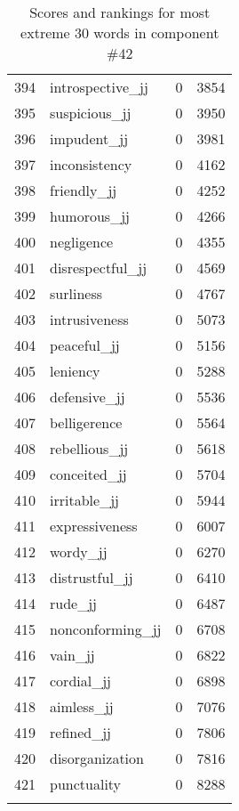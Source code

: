 \begin{longtable}[!htbp]{| rlr@{.}l |}
    394 & introspective\_jj & 0 & 3854 \\
    395 & suspicious\_jj & 0 & 3950 \\
    396 & impudent\_jj & 0 & 3981 \\
    397 & inconsistency & 0 & 4162 \\
    398 & friendly\_jj & 0 & 4252 \\
    399 & humorous\_jj & 0 & 4266 \\
    400 & negligence & 0 & 4355 \\
    401 & disrespectful\_jj & 0 & 4569 \\
    402 & surliness & 0 & 4767 \\
    403 & intrusiveness & 0 & 5073 \\
    404 & peaceful\_jj & 0 & 5156 \\
    405 & leniency & 0 & 5288 \\
    406 & defensive\_jj & 0 & 5536 \\
    407 & belligerence & 0 & 5564 \\
    408 & rebellious\_jj & 0 & 5618 \\
    409 & conceited\_jj & 0 & 5704 \\
    410 & irritable\_jj & 0 & 5944 \\
    411 & expressiveness & 0 & 6007 \\
    412 & wordy\_jj & 0 & 6270 \\
    413 & distrustful\_jj & 0 & 6410 \\
    414 & rude\_jj & 0 & 6487 \\
    415 & nonconforming\_jj & 0 & 6708 \\
    416 & vain\_jj & 0 & 6822 \\
    417 & cordial\_jj & 0 & 6898 \\
    418 & aimless\_jj & 0 & 7076 \\
    419 & refined\_jj & 0 & 7806 \\
    420 & disorganization & 0 & 7816 \\
    421 & punctuality & 0 & 8288 \\
    \hline
    \caption{Scores and rankings for most extreme 30 words in component \#42} \\
\end{longtable}
